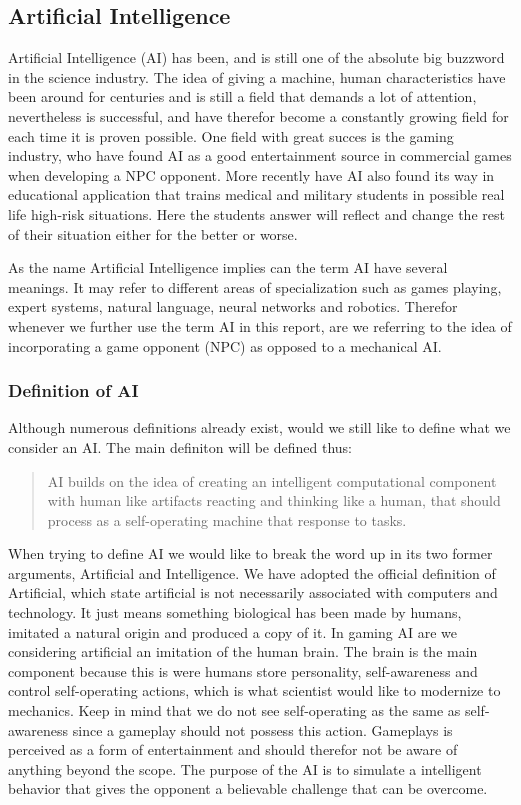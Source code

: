 

\subsection{Artificial Intelligence} \label{sec:ai}
Artificial Intelligence (AI) has been, and is still one of the absolute big buzzword in the science industry.
The idea of giving a machine, human characteristics have been around for centuries and is still a field that demands a lot of attention, nevertheless is successful, and have therefor become a constantly growing field for each time it is proven possible.
One field with great succes is the gaming industry, who have found AI as a good entertainment source in commercial games when developing a NPC opponent. More recently have AI also found its way in educational application that trains medical and military students in possible real life high-risk situations. Here the students answer will reflect and change the rest of their situation either for the better or worse.

As the name Artificial Intelligence implies can the term AI have several meanings. It may refer to different areas of specialization such as games playing, expert systems, natural language, neural networks and robotics.
Therefor whenever we further use the term AI in this report, are we referring to the idea of incorporating a game opponent (NPC) as opposed to a mechanical AI.



\subsubsection{Definition of AI}

Although numerous definitions already exist, would we still like to define what we consider an AI. The main definiton will be defined thus:

		\begin{quote}
		AI builds on the idea of creating an intelligent computational component with human like artifacts 			reacting and thinking like a human, that should process as a self-operating machine that response to 		tasks.
		\end{quote}

When trying to define AI we would like to break the word up in its two former arguments, Artificial and Intelligence.
We have adopted the official definition of Artificial, which state artificial is not necessarily associated with computers and technology. It just means something biological has been made by humans, imitated a natural origin and produced a copy of it.
In gaming AI are we considering artificial an imitation of the human brain. The brain is the main component because this is were humans store personality, self-awareness and control self-operating actions, which is what scientist would like to modernize to mechanics.
Keep in mind that we do not see self-operating as the same as self-awareness since a gameplay should not possess this action. Gameplays is perceived as a form of entertainment and should therefor not be aware of anything beyond the scope. The purpose of the AI is to simulate a intelligent behavior that gives the opponent a believable challenge that can be overcome.

